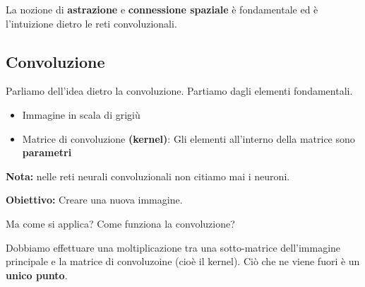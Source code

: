 La nozione di \textbf{astrazione} e \textbf{connessione spaziale} è
fondamentale ed è l'intuizione dietro le reti convoluzionali.

\subsection{Convoluzione}

Parliamo dell'idea dietro la convoluzione. Partiamo dagli elementi
fondamentali.

\begin{itemize}
    \item Immagine in scala di grigiù
    \item Matrice di convoluzione \textbf{(kernel)}: Gli elementi all'interno della
          matrice sono \textbf{parametri}
\end{itemize}

\begin{figure}[H]
    \begin{center}


    \end{center}
\end{figure}
\textbf{Nota:} nelle reti neurali convoluzionali non citiamo mai i neuroni.

\textbf{Obiettivo:} Creare una nuova immagine.

Ma come si applica? Come funziona la convoluzione?

Dobbiamo effettuare una moltiplicazione tra una sotto-matrice dell'immagine
principale e la matrice di convoluzoine (cioè il kernel). Ciò che ne viene
fuori è un \textbf{unico punto}.

\begin{figure}[H]
    \centering
\end{figure}

